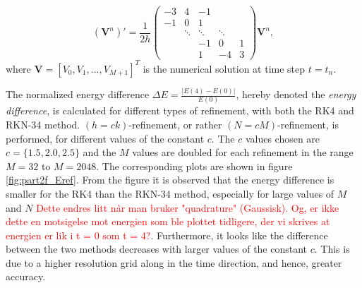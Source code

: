\begin{equation}
    (\boldsymbol{V}^n)' = \frac{1}{2h} 
    \begin{pmatrix}
    -3 & 4 & -1 & &\\
    -1 & 0 & 1 & & \\
    &\ddots & \ddots & \ddots& \\
    & &-1 & 0 & 1 \\
    & & 1 & -4 & 3
    \end{pmatrix}
    \boldsymbol{V}^n,
\end{equation}
where $\boldsymbol{V} = [V_0, V_1, \dots, V_{M+1}]^T$ is the numerical solution at time step $t=t_n$.

The normalized energy difference $\Delta E = \frac{|E(4)-E(0)|}{E(0)}$, hereby denoted the \textit{energy difference}, is calculated for different types of refinement, with both the RK4 and RKN-34 method. $(h=ck)$-refinement, or rather $(N=cM)$-refinement, is performed, for different values of the constant $c$. The $c$ values chosen are $c=\{1.5, 2.0, 2.5\}$ and the $M$ values are doubled for each refinement in the range $M=32$ to $M=2048$. The corresponding plots are shown in figure \ref{fig:part2f_Eref}. From the figure it is observed that the energy difference is smaller for the RK4 than the RKN-34 method, especially for large values of $M$ and $N$ \textcolor{red}{Dette endres litt når man bruker "quadrature" (Gaussisk). Og, er ikke dette en motsigelse mot energien som ble plottet tidligere, der vi skrives at energien er lik i t = 0 som t = 4?}. Furthermore, it looks like the difference between the two methods decreases with larger values of the constant $c$. This is due to a higher resolution grid along in the time direction, and hence, greater accuracy.  

